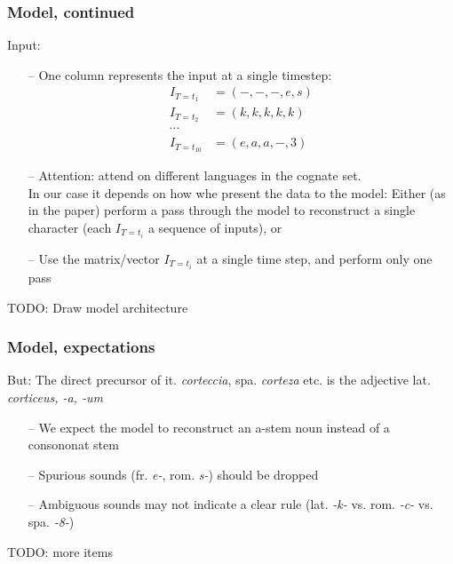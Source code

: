 \documentclass[10pt]{beamer}
\begin{document}
\begin{frame}
    \frametitle{Model, continued}
    Input:
    \begin{itemize}
        \item[--] One column represents the input at a single timestep: 
        \begin{align*}
            I_{T=t_{1}} &= (-,-,-,e,s) \\
            I_{T=t_{2}} &= (k,k,k,k,k) \\
            \cdots \\
            I_{T=t_{10}} &= (e,a,a,-,3)
        \end{align*} 
        \item[--] Attention: \cite{meloni_ab_2019} attend on different languages in the cognate set. \\
        In our case it depends on how whe present the data to the model:
        Either (as in the paper) perform a pass through the model to reconstruct a single character (each $I_{T=t_{i}}$ a sequence of inputs), or 
        \item[--] Use the matrix/vector $I_{T=t_{i}}$ at a single time step, and perform only one pass
    \end{itemize}
    TODO: Draw model architecture
\end{frame}

\begin{frame}
    \frametitle{Model, expectations}
    But: The direct precursor of it. \textit{corteccia}, spa. \textit{corteza} etc. is the adjective lat. \textit{corticeus, -a, -um}
    \begin{itemize}
        \item[--] We expect the model to reconstruct an a-stem noun instead of a consononat stem
        \item[--] Spurious sounds (fr. \textit{e-}, rom. \textit{s-}) should be dropped
        \item[--] Ambiguous sounds may not indicate a clear rule (lat. \textit{-k-} vs. rom. \textit{-c-} vs. spa. \textit{-8-})  
    \end{itemize}
    TODO: more items
\end{frame}
\end{document}
